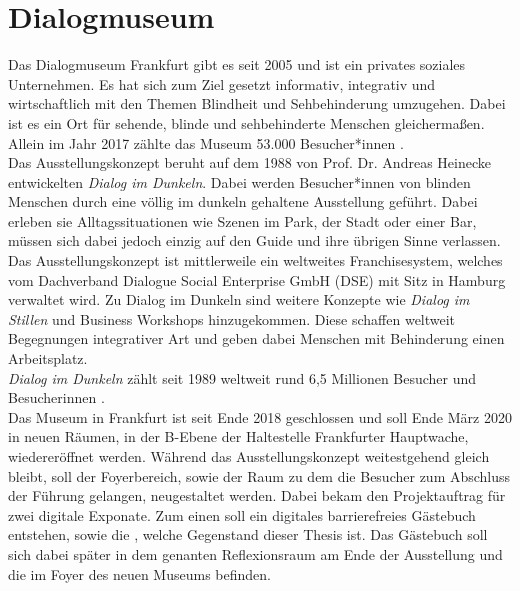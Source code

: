 \section{Dialogmuseum}
\label{sec:dialogmuseum}

Das Dialogmuseum Frankfurt \cite{dialogmuseum} gibt es seit 2005 und ist ein privates soziales 
Unternehmen. Es hat sich zum Ziel gesetzt informativ, integrativ und wirtschaftlich mit 
den Themen Blindheit und Sehbehinderung umzugehen. Dabei ist es ein Ort für sehende, 
blinde und sehbehinderte Menschen gleichermaßen. Allein im Jahr 2017 zählte das Museum 53.000 
Besucher*innen \cite{besucher}.\\

Das Ausstellungskonzept beruht auf dem 1988 von Prof. Dr. Andreas Heinecke entwickelten
\emph{Dialog im Dunkeln}. Dabei werden Besucher*innen von blinden Menschen durch eine 
völlig im dunkeln gehaltene Ausstellung geführt. Dabei erleben sie Alltagssituationen
wie Szenen im Park, der Stadt oder einer Bar, müssen sich dabei jedoch einzig auf
den Guide und ihre übrigen Sinne verlassen.\\

Das Ausstellungskonzept ist mittlerweile ein weltweites Franchisesystem, welches vom 
Dachverband Dialogue Social Enterprise GmbH (DSE) \cite{dachverband} mit Sitz in Hamburg verwaltet wird.
Zu Dialog im Dunkeln sind weitere Konzepte wie \emph{Dialog im Stillen} und Business Workshops
hinzugekommen. Diese schaffen weltweit Begegnungen integrativer Art und geben dabei 
Menschen mit Behinderung einen Arbeitsplatz.\\
\emph{Dialog im Dunkeln} zählt seit 1989 weltweit rund 6,5 Millionen Besucher und Besucherinnen
\cite{weltweit}.\\

Das Museum in Frankfurt ist seit Ende 2018 geschlossen und soll Ende März 2020 in neuen Räumen, in der B-Ebene
der Haltestelle Frankfurter Hauptwache, wiedereröffnet werden. Während das Ausstellungskonzept
weitestgehend gleich bleibt, soll der Foyerbereich, sowie der Raum zu dem die Besucher zum Abschluss
der Führung gelangen, neugestaltet werden. Dabei bekam \meso{} den Projektauftrag für zwei
digitale Exponate. Zum einen soll ein digitales barrierefreies Gästebuch entstehen, sowie die
\shst{}, welche Gegenstand dieser Thesis ist. Das Gästebuch soll sich dabei später in dem 
genanten Reflexionsraum am Ende der Ausstellung und die \shst{} im Foyer des neuen Museums befinden.
